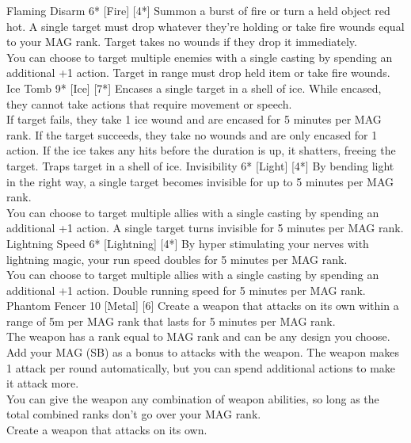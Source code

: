 \begin{pathele}
\spelldescription
{Flaming Disarm}
{6*}
[Fire]
[4*]
{Summon a burst of fire or turn a held object red hot. A single target must drop whatever they're holding or take fire wounds equal to your MAG rank. Target takes no wounds if they drop it immediately.\\
You can choose to target multiple enemies with a single casting by spending an additional +1 action.}
{Target in range must drop held item or take fire wounds.}
\spelldescription
{Ice Tomb}
{9*}
[Ice]
[7*]
{Encases a single target in a shell of ice. While encased, they cannot take actions that require movement or speech.\\If target fails, they take 1 ice wound and are encased for 5 minutes per MAG rank. If the target succeeds, they take no wounds and are only encased for 1 action. If the ice takes any hits before the duration is up, it shatters, freeing the target.}
{Traps target in a shell of ice.}
\spelldescription
{Invisibility}
{6*}
[Light]
[4*]
{By bending light in the right way, a single target becomes invisible for up to 5 minutes per MAG rank.\\You can choose to target multiple allies with a single casting by spending an additional +1 action.}
{A single target turns invisible for 5 minutes per MAG rank.}
\spelldescription
{Lightning Speed}
{6*}
[Lightning]
[4*]
{By hyper stimulating your nerves with lightning magic, your run speed doubles for 5 minutes per MAG rank.\\
You can choose to target multiple allies with a single casting by spending an additional +1 action.}
{Double running speed for 5 minutes per MAG rank.}
\spelldescription
{Phantom Fencer}
{10}
[Metal]
[6]
{Create a weapon that attacks on its own within a range of 5m per MAG rank that lasts for 5 minutes per MAG rank.\\
The weapon has a rank equal to MAG rank and can be any design you choose. Add your MAG (SB) as a bonus to attacks with the weapon. The weapon makes 1 attack per round automatically, but you can spend additional actions to make it attack more.\\
You can give the weapon any combination of weapon abilities, so long as the total combined ranks don't go over your MAG rank.\\
}
{Create a weapon that attacks on its own.}

\end{pathele}
